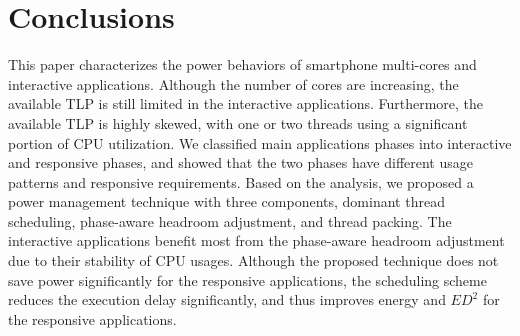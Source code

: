 \section{Conclusions}

This paper characterizes the power behaviors of smartphone multi-cores and interactive applications. 
Although the number of cores are increasing, the available TLP is still limited in the interactive
applications. Furthermore, the available TLP is highly skewed, with one or two threads using
a significant portion of CPU utilization. We classified main applications phases into
interactive and responsive phases, and showed that the two phases have different usage patterns
and responsive requirements.
Based on the analysis, we proposed a power management technique with three components,
dominant thread scheduling, phase-aware headroom adjustment, and thread packing. The interactive
applications benefit most from the phase-aware headroom adjustment due to their stability
of CPU usages. Although the proposed technique does not save power significantly for
the responsive applications, the scheduling scheme reduces the execution delay significantly,
and thus improves energy and $ED^2$ for the responsive applications. 



